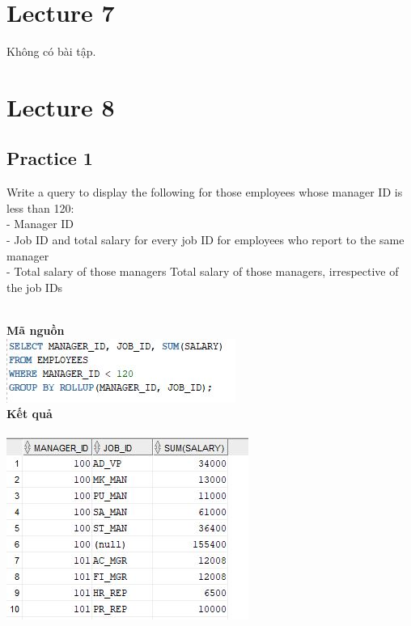 \documentclass[12pt,a4paper]{report}
\begin{document}
\section{Lecture 7}
Không có bài tập.

\section{Lecture 8}
\subsection{Practice 1}
\begin{boxedminipage}[t]{15.5cm}
Write a query to display the following for those employees whose manager ID is less than 120:\\
- Manager ID\\
- Job ID and total salary for every job ID for employees who report to the same
manager\\
- Total salary of those managers
Total salary of those managers, irrespective of the job IDs

\end{boxedminipage}
\newline
\\
\textbf{Mã nguồn}
\\
\newline
\includegraphics[scale=1]{18.jpg}\\
\textbf{Kết quả}\\\\
\includegraphics[scale=1]{k18.jpg}
\end{document}
